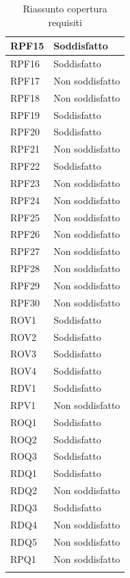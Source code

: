 \begin{longtable}{| p{2.5cm} | p{3cm} |}
	RPF15 & Soddisfatto \\ \hline
	RPF16 & Soddisfatto \\ \hline
	RPF17 & Non soddisfatto \\ \hline
	RPF18 & Non soddisfatto \\ \hline
	RPF19 & Soddisfatto \\ \hline
	RPF20 & Soddisfatto \\ \hline
	RPF21 & Non soddisfatto \\ \hline
	RPF22 & Soddisfatto \\ \hline
	RPF23 & Non soddisfatto \\ \hline
	RPF24 & Non soddisfatto \\ \hline
	RPF25 & Non soddisfatto \\ \hline
	RPF26 & Non soddisfatto \\ \hline
	RPF27 & Non soddisfatto \\ \hline
	RPF28 & Non soddisfatto \\ \hline
	RPF29 & Non soddisfatto \\ \hline
	RPF30 & Non soddisfatto \\ \hline
	ROV1 & Soddisfatto \\ \hline
	ROV2 & Soddisfatto \\ \hline
	ROV3 & Soddisfatto \\ \hline
	ROV4 & Soddisfatto \\ \hline
	RDV1 & Soddisfatto \\ \hline
	RPV1 & Non soddisfatto \\ \hline
	ROQ1 & Soddisfatto \\ \hline
	ROQ2 & Soddisfatto \\ \hline
	ROQ3 & Soddisfatto \\ \hline
	RDQ1 & Soddisfatto \\ \hline
	RDQ2 & Non soddisfatto \\ \hline
	RDQ3 & Soddisfatto \\ \hline
	RDQ4 & Non soddisfatto \\ \hline
	RDQ5 & Non soddisfatto \\ \hline
	RPQ1 & Non soddisfatto \\ \hline
	\caption{Riassunto copertura requisiti}
\end{longtable}


	
